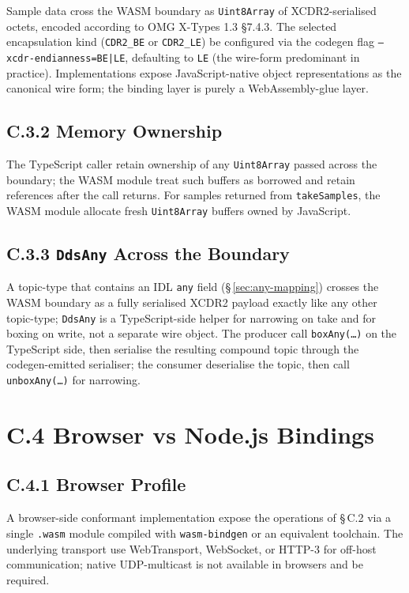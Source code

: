 \documentclass{../styles/zerodds-vendor-spec}
\begin{document}
Sample data  cross the WASM boundary as
\texttt{Uint8Array} of XCDR2-serialised octets, encoded according
to OMG X-Types 1.3 §7.4.3. The selected encapsulation kind
(\texttt{CDR2\_BE} or \texttt{CDR2\_LE})  be
configured via the codegen flag \texttt{--xcdr-endianness=BE|LE},
defaulting to \texttt{LE} (the wire-form predominant in
practice). Implementations
 expose JavaScript-native object representations
as the canonical wire form; the binding layer is purely a
WebAssembly-glue layer.

\subsection*{C.3.2 Memory Ownership}

The TypeScript caller  retain ownership of any
\texttt{Uint8Array} passed across the boundary; the WASM module
 treat such buffers as borrowed and 
retain references after the call returns. For samples returned
from \texttt{takeSamples}, the WASM module  allocate
fresh \texttt{Uint8Array} buffers owned by JavaScript.

\subsection*{C.3.3 \texttt{DdsAny} Across the Boundary}

A topic-type that contains an IDL \texttt{any} field
(\S\,\ref{sec:any-mapping}) crosses the WASM boundary as a fully
serialised XCDR2 payload exactly like any other topic-type;
\texttt{DdsAny} is a TypeScript-side helper for narrowing on
take and for boxing on write, not a separate wire object. The
producer  call \texttt{boxAny(\ldots)} on the
TypeScript side, then serialise the resulting compound topic
through the codegen-emitted serialiser; the consumer 
deserialise the topic, then call \texttt{unboxAny(\ldots)} for
narrowing.

\section*{C.4 Browser vs Node.js Bindings}

\subsection*{C.4.1 Browser Profile}

A browser-side conformant implementation  expose the
operations of \S\,C.2 via a single \texttt{.wasm} module compiled
with \texttt{wasm-bindgen} or an equivalent toolchain. The
underlying transport  use WebTransport, WebSocket,
or HTTP-3 for off-host communication; native UDP-multicast is
not available in browsers and  be required.
\end{document}
